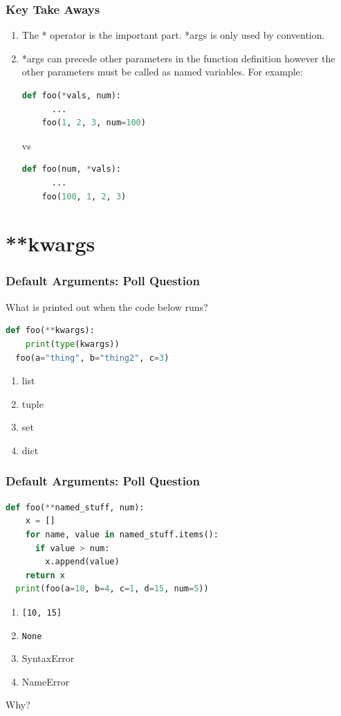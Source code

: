 \documentclass{beamer}
\begin{document}
%
%
\begin{frame}[fragile]
  \frametitle{Key Take Aways}
  \begin{enumerate}[A]
    \item The * operator is the important part. *args is only used by convention.
    \pause
    \item *args can precede other parameters in the function definition however the other parameters must be called as named variables. For example:
    \pause
    \begin{lstlisting}[language=Python, autogobble]
    def foo(*vals, num):
      ...
    foo(1, 2, 3, num=100)
    \end{lstlisting}
    \vfill
    vs
    \vfill
    \begin{lstlisting}[language=Python, autogobble]
    def foo(num, *vals):
      ...
    foo(100, 1, 2, 3)
    \end{lstlisting}
  \end{enumerate}
\end{frame}


\section{**kwargs}

%
%
\begin{frame}[fragile]
  \frametitle{Default Arguments: Poll Question}
  What is printed out when the code below runs?
  \begin{lstlisting}[language=Python, autogobble]
  def foo(**kwargs):
    print(type(kwargs))
  foo(a="thing", b="thing2", c=3)
  \end{lstlisting}
  \vfill
  \begin{enumerate}[A]
    \item list
    \item tuple
    \item set
    \item dict
  \end{enumerate}
\end{frame}


%
%
\begin{frame}[fragile]
  \frametitle{Default Arguments: Poll Question}
  \begin{lstlisting}[language=Python, autogobble]
  def foo(**named_stuff, num):
    x = []
    for name, value in named_stuff.items():
      if value > num:
        x.append(value)
    return x
  print(foo(a=10, b=4, c=1, d=15, num=5))
  \end{lstlisting}
  \vfill
  \begin{enumerate}[A]
    \item \lstinline|[10, 15]|
    \item \lstinline|None|
    \item SyntaxError
    \item NameError
  \end{enumerate}
  \pause
  \vfill
  Why?
\end{frame}
\end{document}
